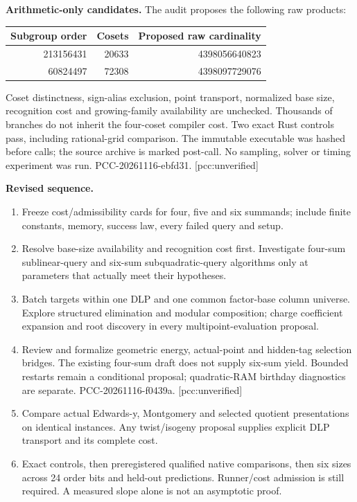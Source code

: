 \documentclass[10pt]{article}
\begin{document}
\textbf{Arithmetic-only candidates.} The audit proposes the following raw products:
\begin{center}\begin{tabular}{rrr}\toprule
Subgroup order&Cosets&Proposed raw cardinality\\\midrule
213156431&20633&4398056640823\\
60824497&72308&4398097729076\\\bottomrule
\end{tabular}\end{center}
Coset distinctness, sign-alias exclusion, point transport, normalized base
size, recognition cost and growing-family availability are unchecked.
Thousands of branches do not inherit the four-coset compiler cost.
Two exact Rust controls pass, including rational-grid comparison. The
immutable executable was hashed before calls; the source archive is marked
post-call. No sampling, solver or timing experiment was run.
PCC-20261116-ebfd31. [pcc:unverified]

\textbf{Revised sequence.}
\begin{enumerate}
\item Freeze cost/admissibility cards for four, five and six summands;
include finite constants, memory, success law, every failed query and setup.
\item Resolve base-size availability and recognition cost first. Investigate
four-sum sublinear-query and six-sum subquadratic-query algorithms only at
parameters that actually meet their hypotheses.
\item Batch targets within one DLP and one common factor-base column universe.
Explore structured elimination and modular composition; charge coefficient
expansion and root discovery in every multipoint-evaluation proposal.
\item Review and formalize geometric energy, actual-point and hidden-tag
selection bridges. The existing four-sum draft does not supply six-sum yield.
Bounded restarts remain a conditional proposal; quadratic-RAM birthday
diagnostics are separate. PCC-20261116-f0439a. [pcc:unverified]
\item Compare actual Edwards-y, Montgomery and selected quotient presentations
on identical instances. Any twist/isogeny proposal supplies explicit DLP
transport and its complete cost.
\item Exact controls, then preregistered qualified native comparisons, then
six sizes across 24 order bits and held-out predictions. Runner/cost admission
is still required. A measured slope alone is not an asymptotic proof.
\end{enumerate}
\end{document}
